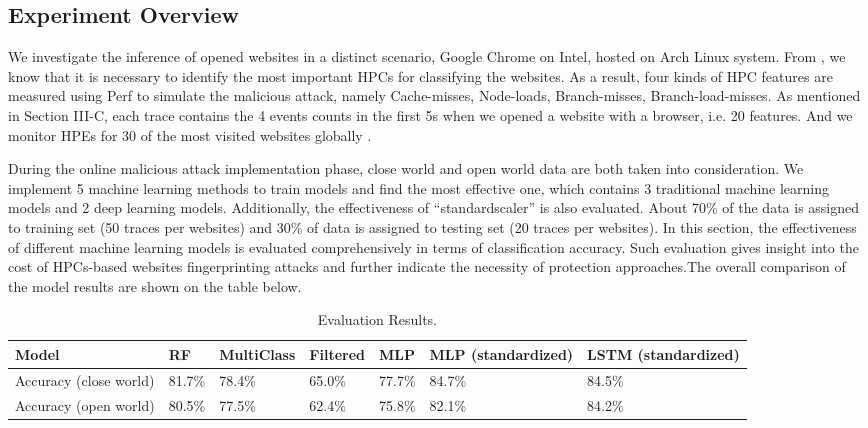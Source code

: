 \documentclass[conference]{IEEEtran}
\begin{document}
\subsection{Experiment Overview}
We investigate the inference of opened websites in a distinct scenario, Google Chrome on Intel, hosted on Arch Linux system. From \cite{b1}, we know that it is necessary to identify the most important HPCs for classifying the websites. As a result, four kinds of HPC features are measured using Perf to simulate the malicious attack, namely Cache-misses, Node-loads, Branch-misses, Branch-load-misses. As mentioned in Section III-C, each trace contains the 4 events counts in the first 5s when we opened a website with a browser, i.e. 20 features. And we monitor HPEs for 30 of the most visited websites globally \cite{b3}.
\par During the online malicious attack implementation phase, close world and open world data are both taken into consideration. We implement 5 machine learning methods to train models and find the most effective one, which contains 3 traditional machine learning models and 2 deep learning models. 
Additionally, the effectiveness of “standardscaler” is also evaluated. About 70\% of the data is assigned to training set (50 traces per websites) and 30\% of data is assigned to testing set (20 traces per websites). In this section, the effectiveness of different machine learning models is evaluated comprehensively in terms of classification accuracy. Such evaluation gives insight into the cost of HPCs-based websites fingerprinting attacks and further indicate the necessity of protection approaches.The overall comparison of the model results are shown on the table below.
\begin{table}[h!]
    \caption{Evaluation Results.\label{table}}
    \centering
    \begin{tabular}{ | m{3em} | m{2em}|m{4em}|m{4em}|m{2em}|m{3em}|m{3em}| }
      \hline
       Model & RF & MultiClass & Filtered & MLP & MLP (standardized) & LSTM (standardized) \\ 
      \hline
      Accuracy (close world) & 81.7\% & 78.4\% & 65.0\% & 77.7\% & 84.7\% & 84.5\% \\ 
      \hline
      Accuracy (open world) & 80.5\% & 77.5\% & 62.4\% & 75.8\% & 82.1\% & 84.2\% \\ 
      \hline
    \end{tabular}
\end{table}
\end{document}
